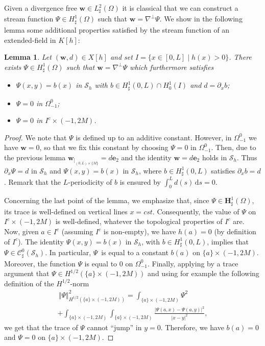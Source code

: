 \documentclass[JEP,XML,SOM,Unicode,NoFloatCountersInSection]{cedram}
\let\mathcal\mathscr
\newtheorem{lemma}[theorem]{Lemma}
\theoremstyle{remark}
\theoremstyle{definition}
\newcommand{\norme}[1]{\,\Vert #1\Vert}
\newcommand{\dd}{\,\mathrm{d}}
\newcommand{\wg}{\boldsymbol{w}}
\newcommand{\BS}[1]{\boldsymbol{#1}}
\begin{document}
Given a divergence free $\wg \in {L}^2_{\sharp}(\Omega)$
it is classical that we can construct a stream function $\Psi \in {H}^1_{\sharp}(\Omega)$ such that $\wg = \nabla^{\bot} \Psi$. We show in the following lemma some additional properties satisfied by the stream function of an extended-field in $K[h]$:

\begin{lemma}\label{lemma.X[h]}
Let $(\wg, d)\in X[h]$ and set $I=\{x\in[0,L]\mid h(x)>0\}$. There exists $\Psi \in {H}^1_\sharp(\Omega)$ such that $\wg=\nabla^\perp\Psi$ which furthermore satisfies
\begin{itemize}
\item $\Psi(x,y)=b(x)$ in $\mathcal{S}_h$ with $b\in H^{1}_{\sharp}(0,L) \cap H^{1}_0(I)$ and $d = \partial_x b$;
\item $\Psi =0$ in $\Omega_{-1}^0$;
\item $\Psi=0$ in $I^{c}\times(-1,2M)$.
\end{itemize}
\end{lemma}
\begin{proof}
We note that $\Psi$ is defined up to an additive constant.
However, in $\Omega_{-1}^0$ we have $\wg=0$, so that we fix this constant by choosing $\Psi=0$ in $\Omega_{-1}^0$. Then,
due to the previous lemma $\wg_{\vert_{(0, L)\times \{M\}}}= d\BS{e}_{2}$ and the identity $\wg=d\BS{e}_{2}$ holds in $\mathcal{S}_{h}$. Thus $\partial_{x}\Psi=d$ in $\mathcal{S}_{h}$ and $\Psi(x,y)=b(x)$ in $\mathcal{S}_{h}$, where $b\in H^{1}_{\sharp}(0,L)$ satisfies $\partial_x b = d$. Remark that the $L$-periodicity of $b$ is ensured by $\int_{0}^{L}d(s)\dd s =0$.

Concerning the last point of the lemma, we emphasize that,
since $\Psi \in \BS{H}^1_{\sharp}(\Omega)$, its trace is well-defined
on vertical lines $x=cst$. Consequently, the value of $\Psi$
on $I^{c} \times (-1,2M)$ is well-defined, whatever the topological properties of $I^c$ are. Now, given $a \in I^{c}$ (assuming $I^{c}$ is non-empty), we have $h(a)=0$ (by definition of $I^c$). The identity $\Psi(x,y)=b(x)$ in $ \mathcal{S}_{h}$, with $b\in H^{1}_{\sharp}(0,L)$, implies that $\Psi\in\mathcal{C}_\sharp^{0}(\mathcal{S}_{h})$. In particular, $\Psi$~is equal to a constant $b(a)$ on $\{a\}\times(-1,2M)$. Moreover, the function $\Psi$ is equal to $0$ on $\Omega_{-1}^{0}$.
Finally, applying by a trace argument that $\Psi \in H^{1/2}(\{a\}\times (-1,2M))$ and using for example the following definition of the $H^{1/2}$-norm\vspace*{-3pt}
\begin{multline*}\norme{\Psi}_{H^{1/2}(\{a\}\times(-1,2M))}^{2} = \int_{\{a\}\times(-1,2M)}\Psi^{2} \\[-5pt]
+ \int_{\{a\}\times(-1,2M)}\int_{\{a\}\times(-1,2M)}\frac{\vert\Psi(a,x)-\Psi(a,y)\vert^{2}}{\vert x-y\vert^{2}},
\end{multline*}
we get that the trace of $\Psi$ cannot ``jump'' in $y=0$.
Therefore, we have $b(a)=0$ and $\Psi=0$ on $\{a\}\times(-1,2M)$.
\end{proof}
\end{document}

